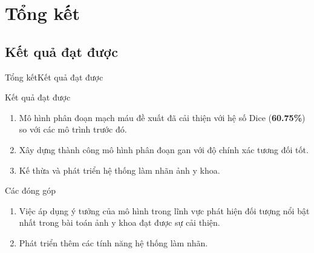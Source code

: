 \documentclass[
	10pt,                %
	aspectratio=169,     %
]{beamer}
\begin{document}
	
\section{Tổng kết}
\subsection{Kết quả đạt được}
	\begin{frame}{Tổng kết}{Kết quả đạt được}
		\begin{block}{Kết quả đạt được}
			\begin{enumerate}
			    \item Mô hình phân đoạn mạch máu đề xuất đã cải thiện với hệ số Dice (\textbf{60.75\%}) so với các mô trình trước đó.
				\item Xây dựng thành công mô hình phân đoạn gan với độ chính xác tương đối tốt.
                \item Kế thừa và phát triển hệ thống làm nhãn ảnh y khoa.
			\end{enumerate}
		\end{block}
		\pause
		\begin{block}{Các đóng góp}
			\begin{enumerate}
				\item Việc áp dụng ý tưởng của mô hình trong lĩnh vực phát hiện đối tượng nổi bật nhất trong bài toán ảnh y khoa đạt được sự cải thiện.
				\item Phát triển thêm các tính năng hệ thống làm nhãn.
			\end{enumerate}
		\end{block}
	\end{frame}
\end{document}
